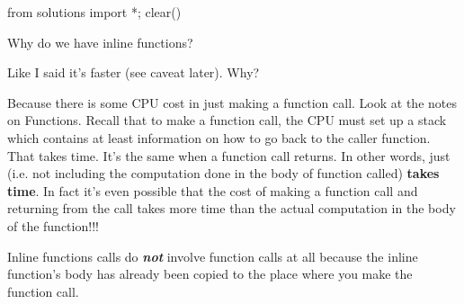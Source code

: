 \begin{python0}
from solutions import *; clear()
\end{python0}

Why do we have inline functions?

Like I said it's faster (see caveat later). Why?

Because there is some CPU cost in just making a function call. Look at the notes on Functions. Recall that to make a function call, the CPU must set up a stack which contains at least information on how to go back to the caller function. That takes time. It's the same when a function call returns. In other words, just  (i.e. not including the computation done in the body of function called) \textbf{takes time}. In fact it's even possible that the cost of making a function call and returning from the call takes more time than the actual computation in the body of the function!!!

Inline functions calls do \textbf{\textit{not}} involve function calls at all because the inline function's body has already been copied to the place where you make the function call.


